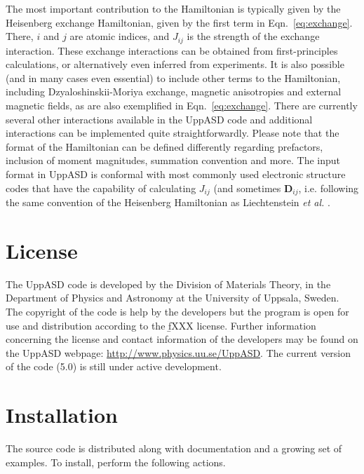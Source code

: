 \documentclass[11pt,fleqn,a4]{book} %
\begin{document}
\noindent The most important contribution to the Hamiltonian is typically given by the Heisenberg exchange Hamiltonian, given by the first term in Eqn.~\ref{eq:exchange}. There, $i$ and $j$ are atomic indices, and $J_{ij}$ is the strength of the exchange interaction. These exchange interactions can be obtained from first-principles calculations, or alternatively even inferred from experiments. It is also possible (and in many cases even essential) to include other terms to the Hamiltonian, including Dzyaloshinskii-Moriya exchange, magnetic anisotropies and external magnetic fields, as are also exemplified in Eqn.~\ref{eq:exchange}. There are currently several other interactions available in the UppASD code and additional interactions can be implemented quite straightforwardly. Please note that the format of the Hamiltonian can be defined differently regarding prefactors, inclusion of moment magnitudes, summation convention and more. The input format in UppASD is conformal with most commonly used electronic structure codes that have the capability of calculating $J_{ij}$ (and sometimes $\mathbf{D}_{ij}$, i.e. following the same convention of the Heisenberg Hamiltonian as Liechtenstein {\it et al.} \cite{Lichtenstein1987}.

\section{License}

The UppASD code is developed by the Division of Materials Theory, in the Department of Physics and Astronomy at the University of Uppsala, Sweden. The copyright of the code is help by the developers but the program is open for use and distribution according to the { \b fXXX} license.
 Further information concerning the license and contact information of the developers may be found on the UppASD webpage: \url{http://www.physics.uu.se/UppASD}. The current version of the code (5.0) is still under active development.

\section{Installation}

The source code is distributed along with documentation and a growing set of examples. To install, perform the following actions.
\end{document}
